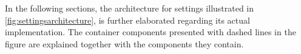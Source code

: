 In the following sections, the architecture for settings illustrated in \cref{fig:settingsarchitecture}, is further elaborated regarding its actual implementation.
The container components presented with dashed lines in the figure are explained together with the components they contain.